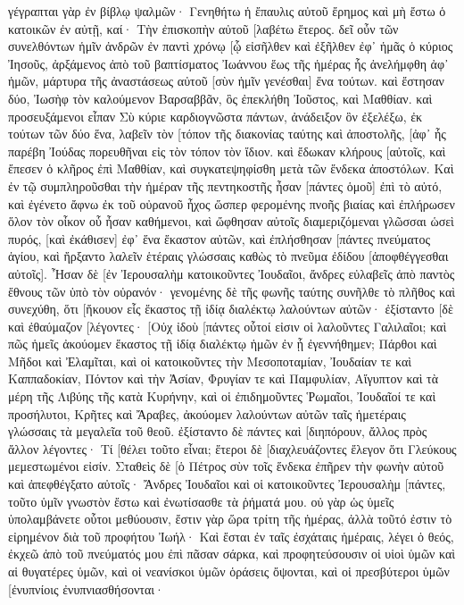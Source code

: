 γέγραπται γὰρ ἐν βίβλῳ ψαλμῶν· Γενηθήτω ἡ ἔπαυλις αὐτοῦ ἔρημος καὶ μὴ ἔστω ὁ κατοικῶν ἐν αὐτῇ, καί· Τὴν ἐπισκοπὴν αὐτοῦ [λαβέτω ἕτερος. 
δεῖ οὖν τῶν συνελθόντων ἡμῖν ἀνδρῶν ἐν παντὶ χρόνῳ [ᾧ εἰσῆλθεν καὶ ἐξῆλθεν ἐφ᾽ ἡμᾶς ὁ κύριος Ἰησοῦς, 
ἀρξάμενος ἀπὸ τοῦ βαπτίσματος Ἰωάννου ἕως τῆς ἡμέρας ἧς ἀνελήμφθη ἀφ᾽ ἡμῶν, μάρτυρα τῆς ἀναστάσεως αὐτοῦ [σὺν ἡμῖν γενέσθαι] ἕνα τούτων. 
καὶ ἔστησαν δύο, Ἰωσὴφ τὸν καλούμενον Βαρσαββᾶν, ὃς ἐπεκλήθη Ἰοῦστος, καὶ Μαθθίαν. 
καὶ προσευξάμενοι εἶπαν Σὺ κύριε καρδιογνῶστα πάντων, ἀνάδειξον ὃν ἐξελέξω, ἐκ τούτων τῶν δύο ἕνα, 
λαβεῖν τὸν [τόπον τῆς διακονίας ταύτης καὶ ἀποστολῆς, [ἀφ᾽ ἧς παρέβη Ἰούδας πορευθῆναι εἰς τὸν τόπον τὸν ἴδιον. 
καὶ ἔδωκαν κλήρους [αὐτοῖς, καὶ ἔπεσεν ὁ κλῆρος ἐπὶ Μαθθίαν, καὶ συγκατεψηφίσθη μετὰ τῶν ἕνδεκα ἀποστόλων. 
Καὶ ἐν τῷ συμπληροῦσθαι τὴν ἡμέραν τῆς πεντηκοστῆς ἦσαν [πάντες ὁμοῦ] ἐπὶ τὸ αὐτό, 
καὶ ἐγένετο ἄφνω ἐκ τοῦ οὐρανοῦ ἦχος ὥσπερ φερομένης πνοῆς βιαίας καὶ ἐπλήρωσεν ὅλον τὸν οἶκον οὗ ἦσαν καθήμενοι, 
καὶ ὤφθησαν αὐτοῖς διαμεριζόμεναι γλῶσσαι ὡσεὶ πυρός, [καὶ ἐκάθισεν] ἐφ᾽ ἕνα ἕκαστον αὐτῶν, 
καὶ ἐπλήσθησαν [πάντες πνεύματος ἁγίου, καὶ ἤρξαντο λαλεῖν ἑτέραις γλώσσαις καθὼς τὸ πνεῦμα ἐδίδου [ἀποφθέγγεσθαι αὐτοῖς]. 
Ἦσαν δὲ [ἐν Ἰερουσαλὴμ κατοικοῦντες Ἰουδαῖοι, ἄνδρες εὐλαβεῖς ἀπὸ παντὸς ἔθνους τῶν ὑπὸ τὸν οὐρανόν· 
γενομένης δὲ τῆς φωνῆς ταύτης συνῆλθε τὸ πλῆθος καὶ συνεχύθη, ὅτι [ἤκουον εἷς ἕκαστος τῇ ἰδίᾳ διαλέκτῳ λαλούντων αὐτῶν· 
ἐξίσταντο [δὲ καὶ ἐθαύμαζον [λέγοντες· [Οὐχ ἰδοὺ [πάντες οὗτοί εἰσιν οἱ λαλοῦντες Γαλιλαῖοι; 
καὶ πῶς ἡμεῖς ἀκούομεν ἕκαστος τῇ ἰδίᾳ διαλέκτῳ ἡμῶν ἐν ᾗ ἐγεννήθημεν; 
Πάρθοι καὶ Μῆδοι καὶ Ἐλαμῖται, καὶ οἱ κατοικοῦντες τὴν Μεσοποταμίαν, Ἰουδαίαν τε καὶ Καππαδοκίαν, Πόντον καὶ τὴν Ἀσίαν, 
Φρυγίαν τε καὶ Παμφυλίαν, Αἴγυπτον καὶ τὰ μέρη τῆς Λιβύης τῆς κατὰ Κυρήνην, καὶ οἱ ἐπιδημοῦντες Ῥωμαῖοι, 
Ἰουδαῖοί τε καὶ προσήλυτοι, Κρῆτες καὶ Ἄραβες, ἀκούομεν λαλούντων αὐτῶν ταῖς ἡμετέραις γλώσσαις τὰ μεγαλεῖα τοῦ θεοῦ. 
ἐξίσταντο δὲ πάντες καὶ [διηπόρουν, ἄλλος πρὸς ἄλλον λέγοντες· Τί [θέλει τοῦτο εἶναι; 
ἕτεροι δὲ [διαχλευάζοντες ἔλεγον ὅτι Γλεύκους μεμεστωμένοι εἰσίν. 
Σταθεὶς δὲ [ὁ Πέτρος σὺν τοῖς ἕνδεκα ἐπῆρεν τὴν φωνὴν αὐτοῦ καὶ ἀπεφθέγξατο αὐτοῖς· Ἄνδρες Ἰουδαῖοι καὶ οἱ κατοικοῦντες Ἰερουσαλὴμ [πάντες, τοῦτο ὑμῖν γνωστὸν ἔστω καὶ ἐνωτίσασθε τὰ ῥήματά μου. 
οὐ γὰρ ὡς ὑμεῖς ὑπολαμβάνετε οὗτοι μεθύουσιν, ἔστιν γὰρ ὥρα τρίτη τῆς ἡμέρας, 
ἀλλὰ τοῦτό ἐστιν τὸ εἰρημένον διὰ τοῦ προφήτου Ἰωήλ· 
Καὶ ἔσται ἐν ταῖς ἐσχάταις ἡμέραις, λέγει ὁ θεός, ἐκχεῶ ἀπὸ τοῦ πνεύματός μου ἐπὶ πᾶσαν σάρκα, καὶ προφητεύσουσιν οἱ υἱοὶ ὑμῶν καὶ αἱ θυγατέρες ὑμῶν, καὶ οἱ νεανίσκοι ὑμῶν ὁράσεις ὄψονται, καὶ οἱ πρεσβύτεροι ὑμῶν [ἐνυπνίοις ἐνυπνιασθήσονται· 

